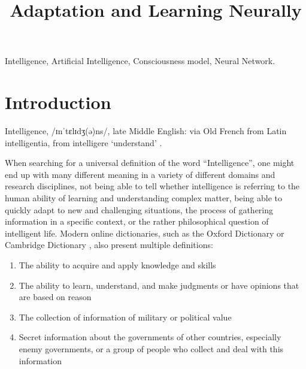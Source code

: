 \documentclass[conference]{IEEEtran}
\begin{document}


\title{Adaptation and Learning Neurally}

\author{
\and
{}
}

\maketitle

\begin{abstract}

\end{abstract}

\begin{IEEEkeywords}
	Intelligence, Artificial Intelligence, Consciousness model, Neural Network.
\end{IEEEkeywords}

\section{Introduction}
	Intelligence, /ɪnˈtɛlɪdʒ(ə)ns/, late Middle English: via Old French from Latin intelligentia, from intelligere ‘understand’ \cite{a1}.

	When searching for a universal definition of the word “Intelligence”, one might end up with many different meaning in a variety of different domains and research disciplines, not being able to tell whether intelligence is referring to the human ability of learning and understanding complex matter, being able to quickly adapt to new and challenging situations, the process of gathering information in a specific context, or the rather philosophical question of intelligent life. Modern online dictionaries, such as the Oxford Dictionary \cite{a1} or Cambridge Dictionary \cite{a2}, also present multiple definitions:

	\begin{enumerate}
		\item The ability to acquire and apply knowledge and skills
		\item The ability to learn, understand, and make judgments or have opinions that are based on reason
		\item The collection of information of military or political value
		\item Secret information about the governments of other countries, especially enemy governments, or a group of people who collect and deal with this information
	\end{enumerate}
\end{document}
